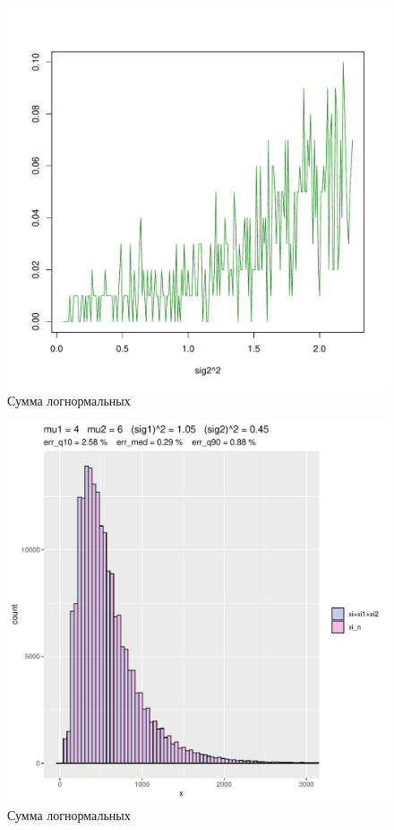 \documentclass[12pt]{article}
\begin{document}
\begin{figure}[!hhh]
	\begin{center}
		\includegraphics[width=1\linewidth]{hist_new_3.pdf}
		\caption{Сумма логнормальных}
		\label{ris12}
	\end{center}
\end{figure}

\begin{figure}[!hhh]
	\begin{center}
		\includegraphics[width=1\linewidth]{hist_new_4.pdf}
		\caption{Сумма логнормальных}
		\label{ris13}
	\end{center}
\end{figure}
\end{document}
